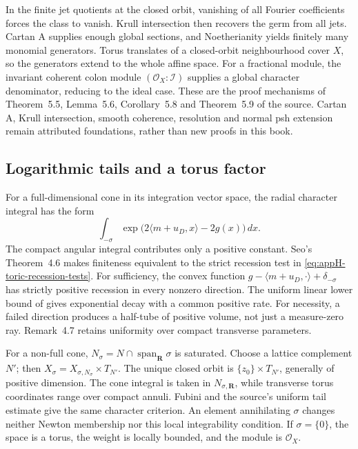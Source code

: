 In the finite jet quotients at the closed orbit, vanishing of all
Fourier coefficients forces the class to vanish. Krull intersection
then recovers the germ from all jets. Cartan A supplies enough global
sections, and Noetherianity yields finitely many monomial generators.
Torus translates of a closed-orbit neighbourhood cover $X$, so the
generators extend to the whole affine space. For a fractional module,
the invariant coherent colon module $(\mathcal O_X:\mathcal I)$
supplies a global character denominator, reducing to the ideal case.
These are the proof mechanisms of Theorem~5.5, Lemma~5.6,
Corollary~5.8 and Theorem~5.9 of the source. Cartan A, Krull
intersection, smooth coherence, resolution and normal psh extension
remain attributed foundations, rather than new proofs in this book.

\subsection{Logarithmic tails and a torus factor}
\label{sec:appH-toric-local-tails}

For a full-dimensional cone in its integration vector space, the
radial character integral has the form
\begin{equation*}
 \int_{-\sigma}
       \exp\bigl(2\langle m+u_D,x\rangle-2g(x)\bigr)\,dx.
\tag{H.68}\label{eq:appH-toric-exponential-integral}
\end{equation*}
The compact angular integral contributes only a positive constant.
Seo's Theorem~4.6 makes finiteness equivalent to the strict recession
test in \eqref{eq:appH-toric-recession-tests}. For sufficiency,
the convex function $g-\langle m+u_D,\cdot\rangle+
\delta_{-\sigma}$ has strictly positive recession in every nonzero
direction. The uniform linear lower bound of
\cite[Theorem~3.26(a)]{RockafellarWets09Author} gives exponential
decay with a common positive rate. For necessity, a failed direction
produces a half-tube of positive volume, not just a measure-zero ray.
Remark~4.7 retains uniformity over compact transverse parameters.

For a non-full cone, $N_\sigma=N\cap\operatorname{span}_{\mathbf R}\sigma$
is saturated. Choose a lattice complement $N'$; then
$X_\sigma=X_{\sigma,N_\sigma}\times T_{N'}$. The unique closed
orbit is $\{z_0\}\times T_{N'}$, generally of positive dimension.
The cone integral is taken in $N_{\sigma,\mathbf R}$, while transverse
torus coordinates range over compact annuli. Fubini and the source's
uniform tail estimate give the same character criterion. An element
annihilating $\sigma$ changes neither Newton membership nor this
local integrability condition. If $\sigma=\{0\}$, the space is a
torus, the weight is locally bounded, and the module is $\mathcal O_X$.

